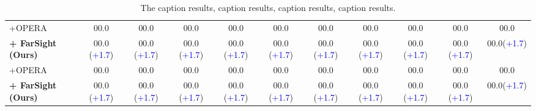\documentclass[letterpaper]{article} %
\begin{document}
\begin{table*}[ht!]
{\begin{tabular}{l||ccc|cc|ccccc}
            \hdashline
            +OPERA    &00.0 &00.0 &00.0 &00.0 &00.0 &00.0 &00.0 &00.0 &00.0 &00.0\\
            \cellcolor{gray!20}\textbf{+ FarSight (Ours)}  &\cellcolor{gray!20}00.0 (\textcolor{blue}{+1.7}) &\cellcolor{gray!20}00.0 (\textcolor{blue}{+1.7})&\cellcolor{gray!20}00.0 (\textcolor{blue}{+1.7})&\cellcolor{gray!20}00.0 (\textcolor{blue}{+1.7})&\cellcolor{gray!20}00.0 (\textcolor{blue}{+1.7})&\cellcolor{gray!20}00.0 (\textcolor{blue}{+1.7})&\cellcolor{gray!20}00.0 (\textcolor{blue}{+1.7})&\cellcolor{gray!20}00.0 (\textcolor{blue}{+1.7})&\cellcolor{gray!20}00.0 (\textcolor{blue}{+1.7})&\cellcolor{gray!20}00.0(\textcolor{blue}{+1.7})\\
            \hdashline
            +OPERA    &00.0 &00.0 &00.0 &00.0 &00.0 &00.0 &00.0 &00.0 &00.0 &00.0\\
            \cellcolor{gray!20}\textbf{+ FarSight (Ours)}  &\cellcolor{gray!20}00.0 (\textcolor{blue}{+1.7}) &\cellcolor{gray!20}00.0 (\textcolor{blue}{+1.7})&\cellcolor{gray!20}00.0 (\textcolor{blue}{+1.7})&\cellcolor{gray!20}00.0 (\textcolor{blue}{+1.7})&\cellcolor{gray!20}00.0 (\textcolor{blue}{+1.7})&\cellcolor{gray!20}00.0 (\textcolor{blue}{+1.7})&\cellcolor{gray!20}00.0 (\textcolor{blue}{+1.7})&\cellcolor{gray!20}00.0 (\textcolor{blue}{+1.7})&\cellcolor{gray!20}00.0 (\textcolor{blue}{+1.7})&\cellcolor{gray!20}00.0(\textcolor{blue}{+1.7})\\
             \bottomrule
       \end{tabular}
   }
   \caption{The caption results, caption results, caption results, caption results.}
\end{table*}
\end{document}
